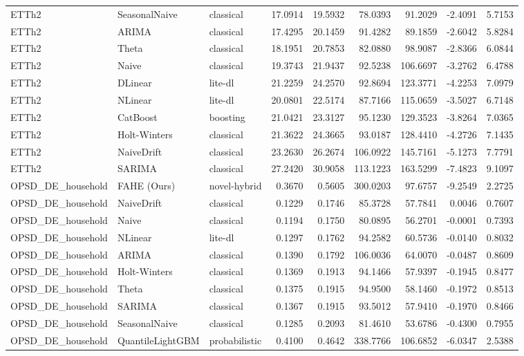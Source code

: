 \begin{tabular}{lllrrrrrr}
ETTh2 & SeasonalNaive & classical & 17.0914 & 19.5932 & 78.0393 & 91.2029 & -2.4091 & 5.7153 \\
ETTh2 & ARIMA & classical & 17.4295 & 20.1459 & 91.4282 & 89.1859 & -2.6042 & 5.8284 \\
ETTh2 & Theta & classical & 18.1951 & 20.7853 & 82.0880 & 98.9087 & -2.8366 & 6.0844 \\
ETTh2 & Naive & classical & 19.3743 & 21.9437 & 92.5238 & 106.6697 & -3.2762 & 6.4788 \\
ETTh2 & DLinear & lite-dl & 21.2259 & 24.2570 & 92.8694 & 123.3771 & -4.2253 & 7.0979 \\
ETTh2 & NLinear & lite-dl & 20.0801 & 22.5174 & 87.7166 & 115.0659 & -3.5027 & 6.7148 \\
ETTh2 & CatBoost & boosting & 21.0421 & 23.3127 & 95.1230 & 129.3523 & -3.8264 & 7.0365 \\
ETTh2 & Holt-Winters & classical & 21.3622 & 24.3665 & 93.0187 & 128.4410 & -4.2726 & 7.1435 \\
ETTh2 & NaiveDrift & classical & 23.2630 & 26.2674 & 106.0922 & 145.7161 & -5.1273 & 7.7791 \\
ETTh2 & SARIMA & classical & 27.2420 & 30.9058 & 113.1223 & 163.5299 & -7.4823 & 9.1097 \\
OPSD_DE_household & FAHE (Ours) & novel-hybrid & 0.3670 & 0.5605 & 300.0203 & 97.6757 & -9.2549 & 2.2725 \\
OPSD_DE_household & NaiveDrift & classical & 0.1229 & 0.1746 & 85.3728 & 57.7841 & 0.0046 & 0.7607 \\
OPSD_DE_household & Naive & classical & 0.1194 & 0.1750 & 80.0895 & 56.2701 & -0.0001 & 0.7393 \\
OPSD_DE_household & NLinear & lite-dl & 0.1297 & 0.1762 & 94.2582 & 60.5736 & -0.0140 & 0.8032 \\
OPSD_DE_household & ARIMA & classical & 0.1390 & 0.1792 & 106.0036 & 64.0070 & -0.0487 & 0.8609 \\
OPSD_DE_household & Holt-Winters & classical & 0.1369 & 0.1913 & 94.1466 & 57.9397 & -0.1945 & 0.8477 \\
OPSD_DE_household & Theta & classical & 0.1375 & 0.1915 & 94.9500 & 58.1460 & -0.1972 & 0.8513 \\
OPSD_DE_household & SARIMA & classical & 0.1367 & 0.1915 & 93.5012 & 57.9410 & -0.1970 & 0.8466 \\
OPSD_DE_household & SeasonalNaive & classical & 0.1285 & 0.2093 & 81.4610 & 53.6786 & -0.4300 & 0.7955 \\
OPSD_DE_household & QuantileLightGBM & probabilistic & 0.4100 & 0.4642 & 338.7766 & 106.6852 & -6.0347 & 2.5388 \\

\end{tabular}
